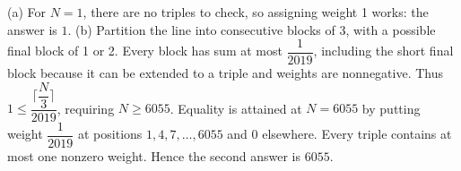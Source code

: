 (a) For $ N=1 $, there are no triples to check, so assigning weight 1 works: the answer is $\boxed1 $. (b) Partition the line into consecutive blocks of 3, with a possible final block of 1 or 2. Every block has sum at most $\dfrac{1}{2019}$, including the short final block because it can be extended to a triple and weights are nonnegative. Thus $ 1\le\dfrac{\lceil \dfrac{N}{3}\rceil}{2019}$, requiring $ N\ge6055 $. Equality is attained at $ N=6055 $ by putting weight $\dfrac{1}{2019}$ at positions $ 1,4,7,\ldots,6055 $ and 0 elsewhere. Every triple contains at most one nonzero weight. Hence the second answer is $\boxed{6055}$.
